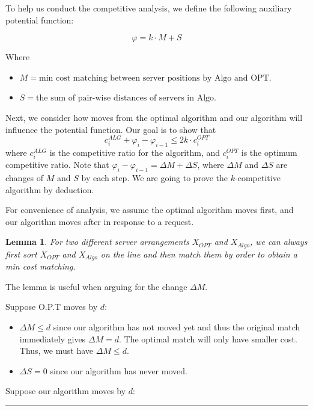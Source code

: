 \documentclass[11pt]{article}
\newenvironment{proof}{{\bf Proof:  }}{\hfill\rule{2mm}{2mm}}
\newtheorem{lemma}[fact]{Lemma}
\begin{document}
\begin{proof}
To help us conduct the competitive analysis, we define the following auxiliary potential function:

$$\varphi = k \cdot M + S$$

Where 
\begin{itemize}
    \item  $M = \text{min cost matching between server positions by Algo and OPT}$.
    \item  $S = \text{the sum of pair-wise distances of servers in Algo}$.
\end{itemize}

Next, we consider how moves from the optimal algorithm and our algorithm will influence the potential function. Our goal is to show that 
$$
c_i^{ALG}+\varphi_i-\varphi_{i-1}\le 2k\cdot c_i^{OPT}
$$
where $c_i^{ALG}$ is the competitive ratio for the algorithm, and $c_i^{OPT}$ is the optimum competitive ratio. Note that $\varphi_i-\varphi_{i-1} = \Delta M + \Delta S$, where $\Delta M$ and $\Delta S$ are changes of $M$ and $S$ by each step. We are going to prove the $k$-competitive algorithm by deduction.

For convenience of analysis, we assume the optimal algorithm moves first, and our algorithm moves after in response to a request.

\begin{lemma}
For two different server arrangements $X_{OPT}$ and $X_{{Algo}}$, we can always first sort $X_{OPT}$ and $X_{Algo}$ on the line and then match them by order to obtain a min cost matching.
\end{lemma}

The lemma is useful when arguing for the change $\Delta{M}$.

Suppose O.P.T moves by $d$:
\begin{itemize}
    \item $\Delta{M} \leq d$ since our algorithm has not moved yet and thus the original match immediately gives $\Delta{M} = d$. The optimal match will only have smaller cost. Thus, we must have $\Delta{M} \leq d$.
    \item $\Delta{S} = 0$ since our algorithm has never moved.
\end{itemize}

Suppose our algorithm moves by $d$:


\end{proof}
\end{document}
